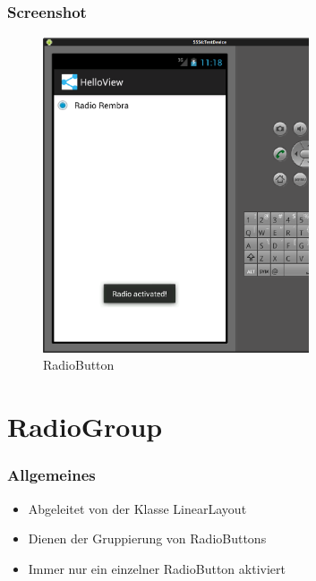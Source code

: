 \begin{frame}
   \frametitle{Screenshot}
	\begin{figure}[h!]
	  \centering
	  \includegraphics[width=0.7\textwidth]{pictures/radio_button.ps}
	  \caption{
		  RadioButton
	  }
	  \label{fig:radio_button}
	\end{figure}
\end{frame}

\section{RadioGroup}
\begin{frame}
   \frametitle{Allgemeines}
   \begin{itemize}
      \item Abgeleitet von der Klasse LinearLayout
      \item Dienen der Gruppierung von RadioButtons
      \item Immer nur ein einzelner RadioButton aktiviert
   \end{itemize}
   
	
\end{frame}

